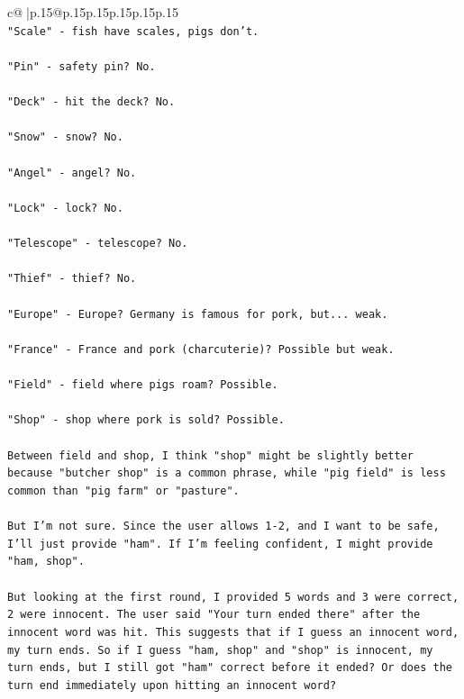 \documentclass{article}
\begin{document}
{\begin{supertabular}{c@{$\;$}|p{.15\linewidth}@{}p{.15\linewidth}p{.15\linewidth}p{.15\linewidth}p{.15\linewidth}p{.15\linewidth}}
{{{\\ 
\texttt{"Scale" {-} fish have scales, pigs don't.} \\
\\ 
\texttt{"Pin" {-} safety pin? No.} \\
\\ 
\texttt{"Deck" {-} hit the deck? No.} \\
\\ 
\texttt{"Snow" {-} snow? No.} \\
\\ 
\texttt{"Angel" {-} angel? No.} \\
\\ 
\texttt{"Lock" {-} lock? No.} \\
\\ 
\texttt{"Telescope" {-} telescope? No.} \\
\\ 
\texttt{"Thief" {-} thief? No.} \\
\\ 
\texttt{"Europe" {-} Europe? Germany is famous for pork, but... weak.} \\
\\ 
\texttt{"France" {-} France and pork (charcuterie)? Possible but weak.} \\
\\ 
\texttt{"Field" {-} field where pigs roam? Possible.} \\
\\ 
\texttt{"Shop" {-} shop where pork is sold? Possible.} \\
\\ 
\texttt{Between field and shop, I think "shop" might be slightly better because "butcher shop" is a common phrase, while "pig field" is less common than "pig farm" or "pasture".} \\
\\ 
\texttt{But I'm not sure. Since the user allows 1{-}2, and I want to be safe, I'll just provide "ham". If I'm feeling confident, I might provide "ham, shop".} \\
\\ 
\texttt{But looking at the first round, I provided 5 words and 3 were correct, 2 were innocent. The user said "Your turn ended there" after the innocent word was hit. This suggests that if I guess an innocent word, my turn ends. So if I guess "ham, shop" and "shop" is innocent, my turn ends, but I still got "ham" correct before it ended? Or does the turn end immediately upon hitting an innocent word?} \\
\\ 
}}}
\end{supertabular}}
\end{document}
